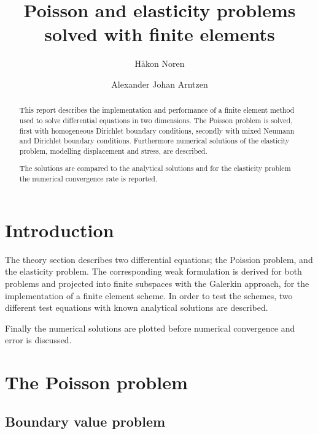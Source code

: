 \documentclass[5pt,a4paper,english]{elsarticle}%
\begin{document}
\begin{frontmatter}

\title{Poisson and elasticity problems solved with finite elements}
\author[matematikk]{Håkon Noren}

\author[matematikk]{Alexander Johan Arntzen }

\address[matematikk]{Department of Mathematical Science, Norwegian University of Science and Technology, N-7491 Trondheim, Norway.}


\begin{abstract}
This report describes the implementation and performance of a finite element method used to solve differential equations in two dimensions. The Poisson problem is solved, first with homogeneous Dirichlet boundary conditions, secondly with mixed Neumann and Dirichlet boundary conditions. Furthermore numerical solutions of the elasticity problem, modelling displacement and stress, are described.

The solutions are compared to the analytical solutions and for the elasticity problem the numerical convergence rate is reported.
\end{abstract}

\end{frontmatter}


\section{Introduction}
The theory section describes two differential equations; the Poission problem, and the elasticity problem. The corresponding weak formulation is derived for both problems and projected into finite subspaces with the Galerkin approach, for the implementation of a finite element scheme. In order to test the schemes, two different test equations with known analytical solutions are described.

Finally the numerical solutions are plotted before numerical convergence and error is discussed.

\section{The Poisson problem}

\subsection{Boundary value problem}
\end{document}
